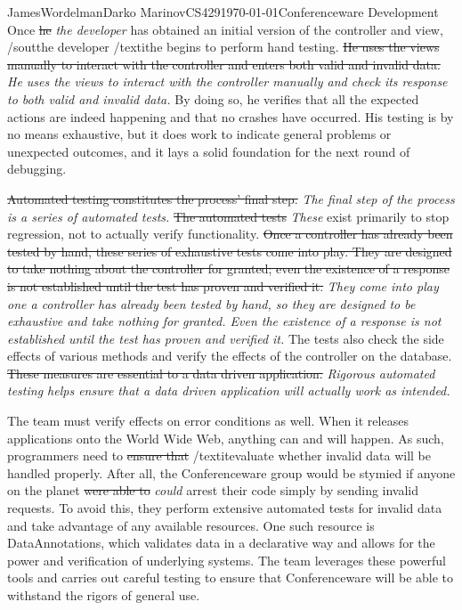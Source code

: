 \documentclass[12pt,letterpaper]{article}
\begin{document}
\begin{mla}{James}{Wordelman}{Darko Marinov}{CS429}{\today}{Conferenceware
Development}
Once \sout{he} \textit{the developer} has obtained an initial version of the controller and view, /sout{the developer} /textit{he} begins to perform hand testing.  \sout{He uses the views manually to interact with the controller and enters both valid and invalid data.} \textit{He uses the views to interact with the controller manually and check its response to both valid and invalid data.} By doing so, he verifies that all the expected actions are indeed happening and that no crashes have occurred. His testing is by no means exhaustive, but it does work to indicate general problems or unexpected outcomes, and it lays a solid foundation for the next round of debugging.

\sout{Automated testing constitutes the process' final step.} \textit{The final step of the process is a series of automated tests.} \sout{The automated tests} \textit{These} exist primarily to stop regression, not to actually verify functionality. \sout{Once a controller has already been tested by hand, these series of exhaustive tests come into play. They are designed to take nothing about the controller for granted; even the existence of a response is not established until the test has proven and verified it.} \textit{They come into play one a controller has already been tested by hand, so they are designed to be exhaustive and take nothing for granted. Even the existence of a response is not established until the test has proven and verified it.}  The tests also check the side effects of various methods and verify the effects of the controller on the database. \sout{These measures are essential to a data driven application.} \textit{Rigorous automated testing helps ensure that a data driven application will actually work as intended.}

	The team must verify effects on error conditions as well. When it releases applications onto the World Wide Web, anything can and will happen. As such, programmers need to \sout{ensure that} /textit{evaluate whether} invalid data will be handled properly. After all, the Conferenceware group would be stymied if anyone on the planet \sout{were able to} \textit{could} arrest their code simply by sending invalid requests.  To avoid this, they perform extensive automated tests for invalid data and take advantage of any available resources. One such resource is DataAnnotations, which validates data in a declarative way and allows for the power and verification of underlying systems.  The team leverages these powerful tools and carries out careful testing to ensure that Conferenceware will be able to withstand the rigors of general use. 


\end{mla}
\end{document}
